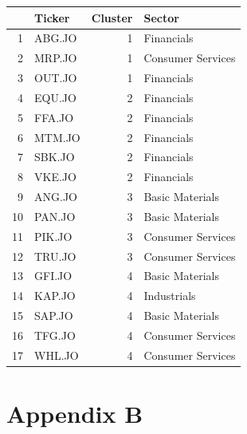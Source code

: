 \documentclass[11pt,preprint, authoryear]{elsarticle}
\let\origtable\table
\let\endorigtable\endtable
\renewenvironment{table}[1][2] {
    \expandafter\origtable\expandafter[H]
} {
    \endorigtable
}
\numberwithin{equation}{section}
\numberwithin{figure}{section}
\numberwithin{table}{section}
\begin{document}
\begin{table}[H]
\centering
\caption{Stock Classification by Sector and Cluster \label{tab2}} 
\begin{tabular}{rlrl}
  \hline
 & Ticker & Cluster & Sector \\ 
  \hline
1 & ABG.JO &   1 & Financials \\ 
  2 & MRP.JO &   1 & Consumer Services \\ 
  3 & OUT.JO &   1 & Financials \\ 
  4 & EQU.JO &   2 & Financials \\ 
  5 & FFA.JO &   2 & Financials \\ 
  6 & MTM.JO &   2 & Financials \\ 
  7 & SBK.JO &   2 & Financials \\ 
  8 & VKE.JO &   2 & Financials \\ 
  9 & ANG.JO &   3 & Basic Materials \\ 
  10 & PAN.JO &   3 & Basic Materials \\ 
  11 & PIK.JO &   3 & Consumer Services \\ 
  12 & TRU.JO &   3 & Consumer Services \\ 
  13 & GFI.JO &   4 & Basic Materials \\ 
  14 & KAP.JO &   4 & Industrials \\ 
  15 & SAP.JO &   4 & Basic Materials \\ 
  16 & TFG.JO &   4 & Consumer Services \\ 
  17 & WHL.JO &   4 & Consumer Services \\ 
   \hline
\end{tabular}
\end{table}

\newpage

\newpage

\hypertarget{appendix-b}{%
\section{\texorpdfstring{Appendix B
\label{app2}}{Appendix B }}\label{appendix-b}}
\end{document}

